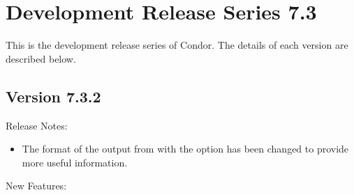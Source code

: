 
\section{\label{sec:History-7-3}Development Release Series 7.3}

This is the development release series of Condor.
The details of each version are described below.

\subsection*{\label{sec:New-7-3-2}Version 7.3.2}

\noindent Release Notes:

\begin{itemize}

\item The format of the output from  with the  option
has been changed to provide more useful information.

\end{itemize}

\noindent New Features:

